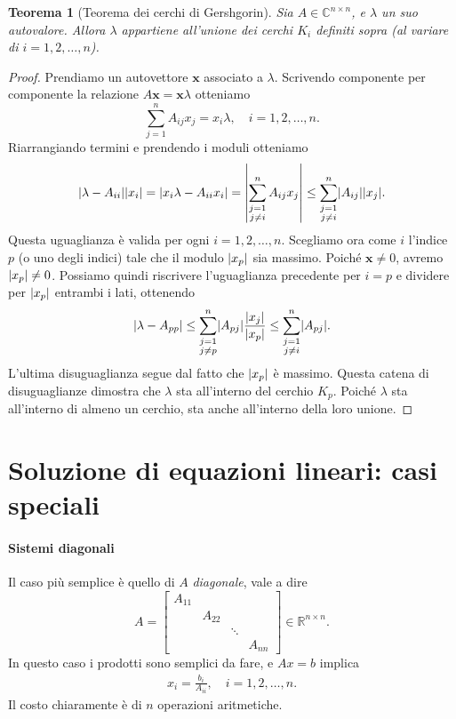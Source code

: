 \documentclass[a4paper]{report}
\DeclarePairedDelimiter{\abs}{\lvert}{\rvert}
\newtheorem{theorem}{Teorema}[chapter]
\theoremstyle{definiton}
\theoremstyle{remark}
\begin{document}
\begin{theorem}[Teorema dei cerchi di Gershgorin]
Sia $A\in\mathbb{C}^{n\times n}$, e $\lambda$ un suo autovalore. Allora $\lambda$ appartiene all'unione dei cerchi $K_i$ definiti sopra (al variare di $i=1,2,\dots,n$).
\end{theorem}
\begin{proof}
Prendiamo un autovettore $\mathbf{x}$ associato a $\lambda$. Scrivendo componente per componente la relazione $A\mathbf{x} = \mathbf{x}\lambda$ otteniamo
\[
\sum_{j=1}^n A_{ij}x_j = x_i \lambda, \quad i=1,2,\dots,n.
\]
Riarrangiando termini e prendendo i moduli otteniamo
\[
\abs{\lambda - A_{ii}}\abs{x_i} = \abs{x_i\lambda - A_{ii}x_i} = \abs*{\sum_{\substack{j=1\\ j \neq i}}^n A_{ij}x_j} \leq \sum_{\substack{j=1\\ j \neq i}}^n \abs{A_{ij}}\abs{x_j}.
\]
Questa uguaglianza è valida per ogni $i=1,2,\dots,n$. Scegliamo ora come $i$ l'indice $p$ (o uno degli indici) tale che il modulo $\abs{x_p}$ sia massimo. Poiché $\mathbf{x}\neq 0$, avremo $\abs{x_p} \neq 0$. Possiamo quindi riscrivere l'uguaglianza precedente per $i=p$ e dividere per $\abs{x_p}$ entrambi i lati, ottenendo
\[
\abs{\lambda - A_{pp}} \leq \sum_{\substack{j=1\\ j \neq p}}^n \abs{A_{pj}}\frac{\abs{x_j}}{\abs{x_p}} \leq \sum_{\substack{j=1\\ j \neq i}}^n \abs{A_{pj}}.
\]
L'ultima disuguaglianza segue dal fatto che $\abs{x_p}$ è massimo. Questa catena di disuguaglianze dimostra che $\lambda$ sta all'interno del cerchio $K_p$. Poiché $\lambda$ sta all'interno di almeno un cerchio, sta anche all'interno della loro unione.
\end{proof}


\section{Soluzione di equazioni lineari: casi speciali}

\paragraph{Sistemi diagonali}

Il caso più semplice è quello di $A$ \emph{diagonale}, vale a dire
\[  
A = \begin{bmatrix}
    A_{11} \\
    & A_{22}\\
    && \ddots\\
    &&& A_{nn}
\end{bmatrix} \in \mathbb{R}^{n \times n}.
\]
In questo caso i prodotti sono semplici da fare, e $Ax=b$ implica
\begin{align*}
x_i = \frac{b_i}{A_{ii}}, \quad i=1,2,\dots,n.
\end{align*}
Il costo chiaramente è di $n$ operazioni aritmetiche.
\end{document}
